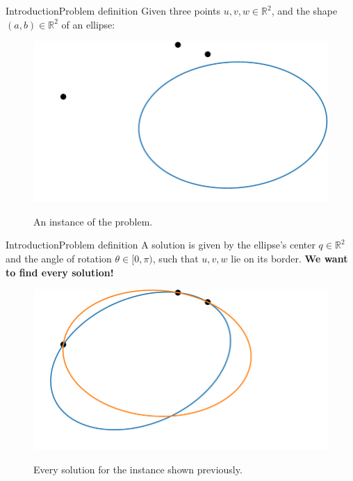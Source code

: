 \documentclass{beamer}
\newcommand{\R}{\mathbb{R}}
\begin{document}
\begin{frame}{Introduction}{Problem definition}
Given three points $u, v, w \in \R^2$, and the shape $(a,b) \in \R^2$ of an ellipse:
	\begin{figure}
	\centering
	
	\includegraphics[scale=.5]{e3psol1.pdf}
	\label{fig:e3psol1}
	\caption{An instance of the problem.}
\end{figure}
\end{frame}

\begin{frame}{Introduction}{Problem definition}
	A solution is given by the ellipse's center $q \in \R^2$ and the angle of rotation $\theta \in [0, \pi)$, such that $u, v, w$ lie on its border. \textbf{We want to find every solution!}
	\begin{figure}
		\centering
		
		\includegraphics[scale=.5]{e3psol2.pdf}
		\label{fig:e3psol2}
		\caption{Every solution for the instance shown previously.}
	\end{figure}
\end{frame}
\end{document}
